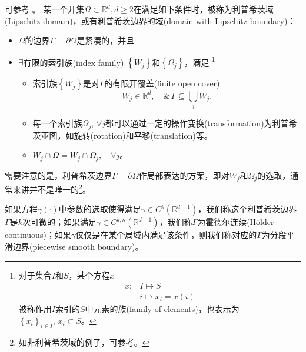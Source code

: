 \begin{definition}[利普希茨域]
  \label{definition:bvp-lipschitz-domain-def}
可参考 \cite{Heinonen:2005wq}。  某一个开集$\Omega \subset \mathbb{R}^d, d \ge 2$在满足如下条件时，被称为利普希茨域(Lipschitz domain)，或有利普希茨边界的域(domain with Lipschitz boundary)：
  \begin{itemize}
    \item $\Omega$的边界$\Gamma = \partial \Omega$是紧凑的，并且
    \item $\exists$有限的索引族(index family)  $\left\{W_j\right\}$和$\left\{ \Omega_j\right\}$，满足
    \footnote{对于集合$I$和$S$，某个方程$x$
    \begin{equation*}
    \begin{split}
      x:&I \mapsto S \\
      &i \mapsto x_i = x(i)
    \end{split}
  \end{equation*}被称作用$I$索引的$S$中元素的族(family of elements)\index{}，也表示为$\left\{ x_i \right\}_{i \in I},\, x_i \subset S$。
  }
  \begin{itemize}
    \item 索引族$\left\{ W_j \right\}$是对$\Gamma$的有限开覆盖(finite open cover)
    \begin{equation*}
      W_j \in \mathbb{R}^d, \quad \& \, \Gamma \subseteq \bigcup_j W_j.
    \end{equation*}
    \item 每一个索引族$\Omega_j, \, \forall j$都可以通过一定的操作变换(transformation)为利普希茨亚图，如旋转(rotation)和平移(translation)等。
    \item $W_j \cap \Omega = W_j \cap \Omega_j, \quad \forall j$。
  \end{itemize}
  \end{itemize}
\end{definition}

需要注意的是，利普希茨边界$\Gamma = \partial \Omega$作局部表达的方案，即对$W_j$和$\Omega_j$的选取，通常来讲并不是唯一的\footnote{如非利普希茨域的例子，可参考\cite{McLean:2000ta}。}。

如果方程$\gamma(\cdot)$中参数的选取使得满足$\gamma \in C^{k}(\mathbb{R}^{d-1})$，我们称这个利普希茨边界$\Gamma$是$k$次可微的；如果满足$\gamma \in C^{k, \kappa}(\mathbb{R}^{d-1})$，我们称$\Gamma$为霍德尔连续(Hölder continuous)；如果$\gamma$仅仅是在某个局域内满足该条件，则我们称对应的$\Gamma$为分段平滑边界(piecewise smooth boundary)。

